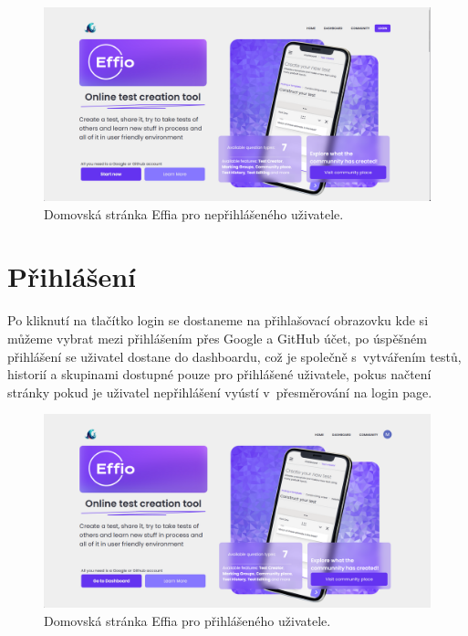 \documentclass[12pt, a4paper,
openright
]{report}
\begin{document}
\begin{figure}[h]
	\centering %
	\includegraphics[width=1\linewidth]{image/homepage-notlogged.png} 
	\caption{Domovská stránka Effia pro nepřihlášeného uživatele.} %
	\label{fig:homepage} %
\end{figure}
\clearpage

\section{Přihlášení}
Po kliknutí na tlačítko login se dostaneme na přihlašovací obrazovku kde si můžeme vybrat mezi přihlášením přes Google a GitHub účet, po úspěšném přihlášení se uživatel dostane do dashboardu, což je společně s~vytvářením testů, historií a skupinami dostupné pouze pro přihlášené uživatele, pokus načtení stránky pokud je uživatel nepřihlášení vyústí v~přesměrování na login page.

\begin{figure}[h]
	\centering %
	\includegraphics[width=1\linewidth]{image/homepage.png} 
	\caption{Domovská stránka Effia pro přihlášeného uživatele.} %
	\label{fig:homepage-loggedin} %
\end{figure}
\end{document}
